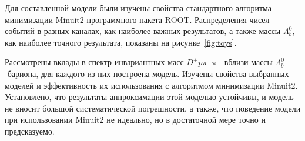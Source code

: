\documentclass[a4paper, 12pt]{article}
\def\Lb{\varLambda_b^0}
\def\Dp{D^+}
\def\pim{\pi^-}
\begin{document}
Для составленной модели были изучены свойства стандартного алгоритма минимизации Minuit2 программного пакета ROOT. Распределения чисел событий в разных каналах, как наиболее важных результатов, а также массы $\Lb$, как наиболее точного результата, показаны на рисунке~\ref{fig:toys}. 


Рассмотрены вклады в спектр инвариантных масс $\Dp p\pim\pim$ вблизи массы $\Lb$-бариона, для каждого из них построена модель. 
Изучены свойства выбранных моделей и эффективность их использования с алгоритмом минимизации Minuit2. 
Установлено, что результаты аппроксимации этой моделью устойчивы, и модель не вносит большой систематической погрешности, а также, что
поведение модели при использовании Minuit2 не идеально, но в достаточной мере точно и предсказуемо. 










\end{document}
